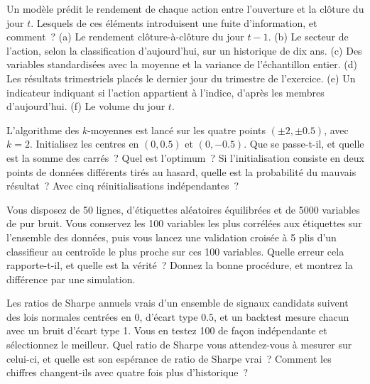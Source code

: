 \begin{question}\label{iq:iv1:machine-learning:29}
Un modèle prédit le rendement de chaque action entre l'ouverture et la clôture du jour $t$. Lesquels de ces éléments introduisent une fuite d'information, et comment~? (a) Le rendement clôture-à-clôture du jour $t - 1$. (b) Le secteur de l'action, selon la classification d'aujourd'hui, sur un historique de dix ans. (c) Des variables standardisées avec la moyenne et la variance de l'échantillon entier. (d) Les résultats trimestriels placés le dernier jour du trimestre de l'exercice. (e) Un indicateur indiquant si l'action appartient à l'indice, d'après les membres d'aujourd'hui. (f) Le volume du jour $t$.
\end{question}

\begin{question}\label{iq:iv1:machine-learning:30}
L'algorithme des $k$-moyennes est lancé sur les quatre points $(\pm 2, \pm 0.5)$, avec $k = 2$. Initialisez les centres en $(0, 0.5)$ et $(0, -0.5)$. Que se passe-t-il, et quelle est la somme des carrés~? Quel est l'optimum~? Si l'initialisation consiste en deux points de données différents tirés au hasard, quelle est la probabilité du mauvais résultat~? Avec cinq réinitialisations indépendantes~?
\end{question}

\begin{question}\label{iq:iv1:machine-learning:31}
Vous disposez de 50 lignes, d'étiquettes aléatoires équilibrées et de 5000 variables de pur bruit. Vous conservez les 100 variables les plus corrélées aux étiquettes sur l'ensemble des données, puis vous lancez une validation croisée à 5 plis d'un classifieur au centroïde le plus proche sur ces 100 variables. Quelle erreur cela rapporte-t-il, et quelle est la vérité~? Donnez la bonne procédure, et montrez la différence par une simulation.
\end{question}

\begin{question}\label{iq:iv1:machine-learning:32}
Les ratios de Sharpe annuels vrais d'un ensemble de signaux candidats suivent des lois normales centrées en 0, d'écart type $0.5$, et un backtest mesure chacun avec un bruit d'écart type 1. Vous en testez 100 de façon indépendante et sélectionnez le meilleur. Quel ratio de Sharpe vous attendez-vous à mesurer sur celui-ci, et quelle est son espérance de ratio de Sharpe vrai~? Comment les chiffres changent-ils avec quatre fois plus d'historique~?
\end{question}


